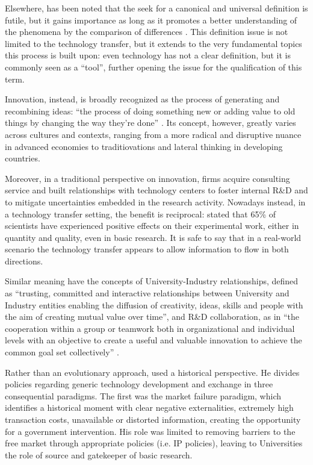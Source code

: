 Elsewhere, has been noted that the seek for a canonical and universal definition is futile, but it gains importance as long as it promotes a better understanding of the phenomena by the comparison of differences \citep{Bozeman2000}. This definition issue is not limited to the technology transfer, but it extends to the very fundamental topics this process is built upon: even technology has not a clear definition, but it is commonly seen as a \enquote{tool}, further opening the issue for the qualification of this term. 

Innovation, instead, is broadly recognized as the process of generating and recombining ideas: \enquote{the process of doing something new or adding value to old things by changing the way they're done} \citep{Baskaran2016}. Its concept, however, greatly varies across cultures and contexts, ranging from a more radical and disruptive nuance in advanced economies to traditiovations and lateral thinking in developing countries.

Moreover, in a traditional perspective on innovation, firms acquire consulting service and built relationships with technology centers to foster internal R\&D and to mitigate uncertainties embedded in the research activity. Nowadays instead, in a technology transfer setting, the benefit is reciprocal: \citet{Siegel2003a} stated that 65\% of scientists have experienced positive effects on their experimental work, either in quantity and quality, even in basic research. It is safe to say that in a real-world scenario the technology transfer appears to allow information to flow in both directions.

Similar meaning have the concepts of University-Industry relationships, defined as \enquote{trusting, committed and interactive relationships between University and Industry entities enabling the diffusion of creativity, ideas, skills and people with the aim of creating mutual value over time}, and R\&D collaboration, as in \enquote{the cooperation within a group or teamwork both in organizational and individual levels with an objective to create a useful and valuable innovation to achieve the common goal set collectively} \citep{Frasquet2012}. 

Rather than an evolutionary approach, \citet{Bozeman2000} used a historical perspective. He divides policies regarding generic technology development and exchange in three consequential paradigms. The first was the market failure paradigm, which identifies a historical moment with clear negative externalities, extremely high transaction costs, unavailable or distorted information, creating the opportunity for a government intervention. His role was limited to removing barriers to the free market through appropriate policies (i.e. IP policies), leaving to Universities the role of source and gatekeeper of basic research.

